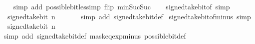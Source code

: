 \begin{isabellebody}
\ \ \isamarkupfalse%
\ {\isacharparenleft}{\kern0pt}simp\ add{\isacharcolon}{\kern0pt}\ possible{\isacharunderscore}{\kern0pt}bit{\isacharunderscore}{\kern0pt}less{\isacharunderscore}{\kern0pt}imp\ flip{\isacharcolon}{\kern0pt}\ min{\isacharunderscore}{\kern0pt}Suc{\isacharunderscore}{\kern0pt}Suc{\isacharparenright}{\kern0pt}\isanewline
\ \ \isamarkupfalse%
%
\endisatagproof
{\isafoldproof}%
%
\isadelimproof
\isanewline
%
\endisadelimproof
\isanewline
{}\isamarkupfalse%
\ signed{\isacharunderscore}{\kern0pt}take{\isacharunderscore}{\kern0pt}bit{\isacharunderscore}{\kern0pt}of{\isacharunderscore}{\kern0pt}{}\ {\isacharbrackleft}{\kern0pt}simp{\isacharbrackright}{\kern0pt}{\isacharcolon}{\kern0pt}\isanewline
\ \ {\isacartoucheopen}signed{\isacharunderscore}{\kern0pt}take{\isacharunderscore}{\kern0pt}bit\ n\ {}\ {\isacharequal}{\kern0pt}\ {}{\isacartoucheclose}\isanewline
%
\isadelimproof
\ \ %
\endisadelimproof
%
\isatagproof
{}\isamarkupfalse%
\ {\isacharparenleft}{\kern0pt}simp\ add{\isacharcolon}{\kern0pt}\ signed{\isacharunderscore}{\kern0pt}take{\isacharunderscore}{\kern0pt}bit{\isacharunderscore}{\kern0pt}def{\isacharparenright}{\kern0pt}%
\endisatagproof
{\isafoldproof}%
%
\isadelimproof
\isanewline
%
\endisadelimproof
\isanewline
{}\isamarkupfalse%
\ signed{\isacharunderscore}{\kern0pt}take{\isacharunderscore}{\kern0pt}bit{\isacharunderscore}{\kern0pt}of{\isacharunderscore}{\kern0pt}minus{\isacharunderscore}{\kern0pt}{}\ {\isacharbrackleft}{\kern0pt}simp{\isacharbrackright}{\kern0pt}{\isacharcolon}{\kern0pt}\isanewline
\ \ {\isacartoucheopen}signed{\isacharunderscore}{\kern0pt}take{\isacharunderscore}{\kern0pt}bit\ n\ {\isacharparenleft}{\kern0pt}{\isacharminus}{\kern0pt}\ {}{\isacharparenright}{\kern0pt}\ {\isacharequal}{\kern0pt}\ {\isacharminus}{\kern0pt}\ {}{\isacartoucheclose}\isanewline
%
\isadelimproof
\ \ %
\endisadelimproof
%
\isatagproof
{}\isamarkupfalse%
\ {\isacharparenleft}{\kern0pt}simp\ add{\isacharcolon}{\kern0pt}\ signed{\isacharunderscore}{\kern0pt}take{\isacharunderscore}{\kern0pt}bit{\isacharunderscore}{\kern0pt}def\ mask{\isacharunderscore}{\kern0pt}eq{\isacharunderscore}{\kern0pt}exp{\isacharunderscore}{\kern0pt}minus{\isacharunderscore}{\kern0pt}{}\ possible{\isacharunderscore}{\kern0pt}bit{\isacharunderscore}{\kern0pt}def{\isacharparenright}{\kern0pt}%
\endisatagproof
{\isafoldproof}%
%
\isadelimproof
\isanewline
%
\endisadelimproof
\isanewline
{}\isamarkupfalse%

\end{isabellebody}
